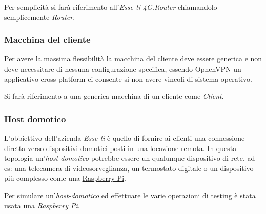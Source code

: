 Per semplicità si farà riferimento all'\textit{Esse-ti 4G.Router} chiamandolo semplicemente \textit{Router}.

\subsubsection{Macchina del cliente}
\label{subsec:macchina-cliente}

Per avere la massima flessibilità la macchina del cliente deve essere generica e non deve necessitare di nessuna configurazione specifica, essendo OpnenVPN un applicativo cross-platform ci consente si non avere vincoli di sistema operativo.

Si farà riferimento a una generica macchina di un cliente come \textit{Client}.

\subsubsection{Host domotico}

L'obbiettivo dell'azienda \textit{Esse-ti} è quello di fornire ai clienti una connessione diretta verso dispositivi domotici posti in una locazione remota. In questa topologia un'\textit{host-domotico} potrebbe essere un qualunque dispositivo di rete, ad es: una telecamera di videosorveglianza, un termostato digitale o un dispositivo più complesso come una \href{https://en.wikipedia.org/wiki/Raspberry_Pi}{Raspberry Pi}.

Per simulare un'\textit{host-domotico} ed effettuare le varie operazioni di testing è stata usata una \textit{Raspberry Pi}.


